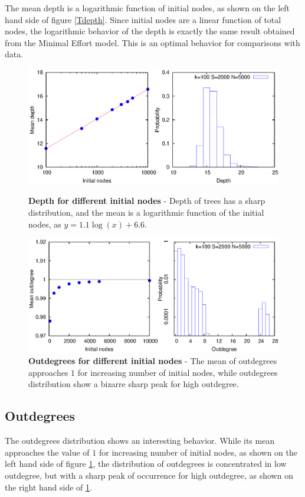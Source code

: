The mean depth is a logarithmic function of initial nodes, as shown on the left hand side of figure \ref{Tdepth}. Since initial nodes are a linear function of total nodes, the logarithmic behavior of the depth is exactly the same result obtained from the Minimal Effort model. This is an optimal behavior for comparisons with data.

\begin{figure}[p]%
\includegraphics[width=\textwidth,draft=false]{grafici/Tdepth.eps}
\caption{\label{Tdepth} \footnotesize\textbf{Depth for different initial nodes} - Depth of trees has a sharp distribution, and the mean is a logarithmic function of the initial nodes, as $y=1.1\log(x) + 6.6$.}
\vspace{1cm}
\includegraphics[width=\textwidth,draft=false]{grafici/Toutdeg.eps}
\caption{\label{Toutdeg} \footnotesize\textbf{Outdegrees for different initial nodes} - The mean of outdegrees approaches $1$ for increasing number of initial nodes, while outdegrees distribution show a bizarre sharp peak for high outdegree.}
\end{figure}

\subsection{Outdegrees}
The outdegrees distribution shows an interesting behavior. While its mean approaches the value of $1$ for increasing number of initial nodes, as shown on the left hand side of figure \ref{Toutdeg}, the distribution of outdegrees is concentrated in low outdegree, but with a sharp peak of occurrence for high outdegree, as shown on the right hand side of \ref{Toutdeg}.

